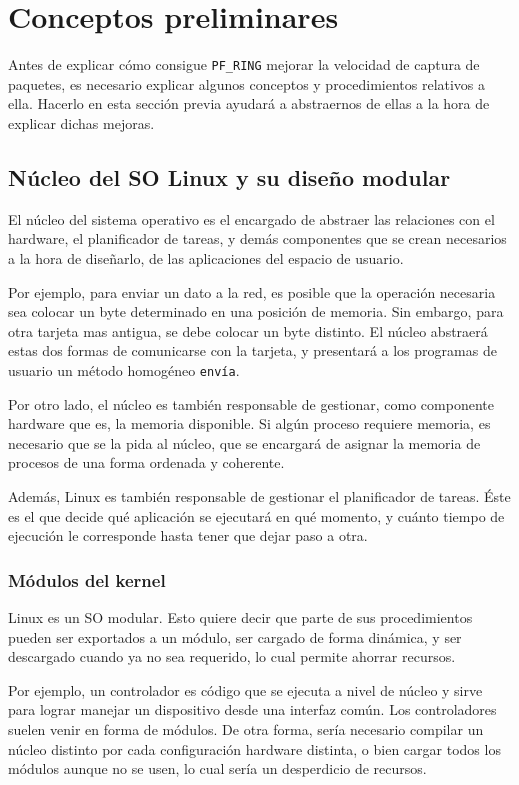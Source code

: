 \section{Conceptos preliminares}
Antes de explicar cómo consigue \texttt{PF\_RING} mejorar la velocidad de captura de paquetes, es necesario explicar 
algunos conceptos y procedimientos relativos a ella. Hacerlo en esta sección previa ayudará a abstraernos de ellas a 
la hora de explicar dichas mejoras.

\subsection{Núcleo del SO Linux y su diseño modular}
El núcleo del sistema operativo es el encargado de abstraer las relaciones con el hardware, el planificador de tareas, 
y demás componentes que se crean necesarios a la hora de diseñarlo, de las aplicaciones del espacio de usuario.

Por ejemplo, para enviar un dato a la red, es posible que la operación necesaria sea colocar un byte determinado en una 
posición de memoria. Sin embargo, para otra tarjeta mas antigua, se debe colocar un byte distinto. El núcleo abstraerá 
estas dos formas de comunicarse con la tarjeta, y presentará a los programas de usuario un método homogéneo 
\texttt{envía}.

Por otro lado, el núcleo es también responsable de gestionar, como componente hardware que es, la memoria disponible. 
Si algún proceso requiere memoria, es necesario que se la pida al núcleo, que se encargará de asignar la memoria de 
procesos de una forma ordenada y coherente.

Además, Linux es también responsable de gestionar el planificador de tareas. Éste es el que decide qué aplicación se 
ejecutará en qué momento, y cuánto tiempo de ejecución le corresponde hasta tener que dejar paso a otra. 

\subsubsection{Módulos del kernel}
Linux es un \gls{SO} modular. Esto quiere decir que parte de sus procedimientos pueden ser exportados a un módulo, ser 
cargado de forma dinámica, y ser descargado cuando ya no sea requerido, lo cual permite ahorrar recursos.

Por ejemplo, un controlador es código que se ejecuta a nivel de núcleo y sirve para lograr manejar un dispositivo desde 
una interfaz común. Los controladores suelen venir en forma de módulos. De otra forma, sería necesario compilar un 
núcleo distinto por cada configuración hardware distinta, o bien cargar todos los módulos aunque no se usen, lo cual 
sería un desperdicio de recursos.

